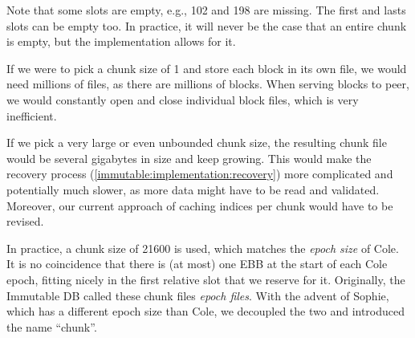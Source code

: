 \begin{center}
\end{center}
Note that some slots are empty, e.g., 102 and 198 are missing. The first and
lasts slots can be empty too. In practice, it will never be the case that an
entire chunk is empty, but the implementation allows for it.

If we were to pick a chunk size of 1 and store each block in its own file, we
would need millions of files, as there are millions of blocks. When serving
blocks to peer, we would constantly open and close individual block files, which
is very inefficient.

If we pick a very large or even unbounded chunk size, the resulting chunk file
would be several gigabytes in size and keep growing. This would make the
recovery process (\cref{immutable:implementation:recovery}) more complicated and
potentially much slower, as more data might have to be read and
validated. Moreover, our current approach of caching
indices per chunk would have to be revised.

In practice, a chunk size of \num{21600} is used, which matches the \emph{epoch
size} of Cole. It is no coincidence that there is (at most) one EBB at the
start of each Cole epoch, fitting nicely in the first relative slot that we
reserve for it. Originally, the Immutable DB called these chunk files
\emph{epoch files}. With the advent of Sophie, which has a different epoch size
than Cole, we decoupled the two and introduced the name ``chunk''.

